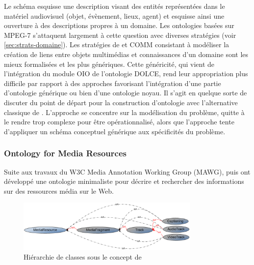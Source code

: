 Le schéma  esquisse une description visant des entités représentées dans le matériel audiovisuel (objet, évènement, lieux, agent) et esquisse ainsi une ouverture à des descriptions propres à un domaine.
Les ontologies basées sur MPEG-7 s'attaquent largement à cette question avec diverses stratégies (voir \ref{sec:strats-domaine}). 
Les stratégies de  et COMM consistant à modéliser la création de liens entre objets multimédias et connaissances d'un domaine sont les mieux formalisées et les plus génériques.
Cette généricité, qui vient de l'intégration du module OIO de l'ontologie DOLCE, rend leur appropriation plus difficile par rapport à des approches favorisant l'intégration d'une partie d'ontologie générique ou bien d'une ontologie noyau.
Il s'agit en quelque sorte de discuter du point de départ pour la construction d'ontologie avec l'alternative classique de  .
L'approche  se concentre sur la modélisation du problème, quitte à le rendre trop complexe pour être opérationnalisé, alors que l'approche  tente d'appliquer un schéma conceptuel générique aux spécificités du problème.





\subsubsection{Ontology for Media Resources}\label{sec:omr}
Suite aux travaux du W3C Media Annotation Working Group (MAWG), \cite{Burger2011} puis \cite{Lee2012} ont développé une ontologie minimaliste pour décrire et rechercher des informations sur des ressources média sur le Web.

\begin{figure}[ht!]
\centering
\includegraphics[width=0.8\textwidth]{images/MA-model.png}
\caption{Hiérarchie de classes sous le concept de }
\label{img:ma-model}
\end{figure}

